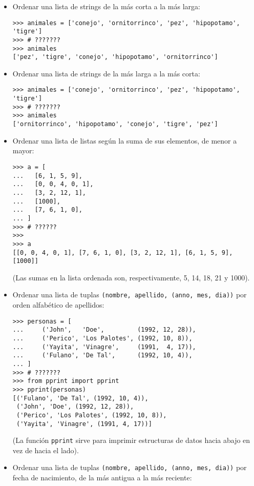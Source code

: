 \begin{itemize}
\item
  Ordenar una lista de strings de la más corta a la más larga:

\begin{lstlisting}
>>> animales = ['conejo', 'ornitorrinco', 'pez', 'hipopotamo', 'tigre']
>>> # ???????
>>> animales
['pez', 'tigre', 'conejo', 'hipopotamo', 'ornitorrinco']
\end{lstlisting}
\item
  Ordenar una lista de strings de la más larga a la más corta:

\begin{lstlisting}
>>> animales = ['conejo', 'ornitorrinco', 'pez', 'hipopotamo', 'tigre']
>>> # ???????
>>> animales
['ornitorrinco', 'hipopotamo', 'conejo', 'tigre', 'pez']
\end{lstlisting}
\item
  Ordenar una lista de listas según la suma de sus elementos, de menor a
  mayor:

\begin{lstlisting}
>>> a = [
...   [6, 1, 5, 9],
...   [0, 0, 4, 0, 1],
...   [3, 2, 12, 1],
...   [1000],
...   [7, 6, 1, 0],
... ]
>>> # ??????
>>>
>>> a
[[0, 0, 4, 0, 1], [7, 6, 1, 0], [3, 2, 12, 1], [6, 1, 5, 9], [1000]]
\end{lstlisting}

  (Las sumas en la lista ordenada son, respectivamente, 5, 14, 18, 21 y
  1000).
\item
  Ordenar una lista de tuplas
  \lstinline!(nombre, apellido, (anno, mes, dia))! por orden alfabético
  de apellidos:

\begin{lstlisting}
>>> personas = [
...     ('John',   'Doe',         (1992, 12, 28)),
...     ('Perico', 'Los Palotes', (1992, 10, 8)),
...     ('Yayita', 'Vinagre',     (1991,  4, 17)),
...     ('Fulano', 'De Tal',      (1992, 10, 4)),
... ]
>>> # ???????
>>> from pprint import pprint
>>> pprint(personas)
[('Fulano', 'De Tal', (1992, 10, 4)),
 ('John', 'Doe', (1992, 12, 28)),
 ('Perico', 'Los Palotes', (1992, 10, 8)),
 ('Yayita', 'Vinagre', (1991, 4, 17))]
\end{lstlisting}

  (La función \lstinline!pprint! sirve para imprimir estructuras de
  datos hacia abajo en vez de hacia el lado).
\item
  Ordenar una lista de tuplas
  \lstinline!(nombre, apellido, (anno, mes, dia))! por fecha de
  nacimiento, de la más antigua a la más reciente:


\end{itemize}
